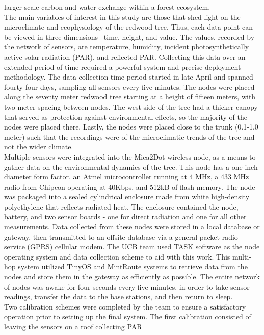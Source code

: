 \documentclass[]{article}
\begin{document}
larger scale carbon and water exchange within a forest ecosystem.\\
The main variables of interest in this study are those that shed light
on the microclimate and ecophysiology of the redwood tree. Thus, each
data point can be viewed in three dimensions-- time, height, and value.
The values, recorded by the network of sensors, are temperature,
humidity, incident photosynthetically active solar radiation (PAR), and
reflected PAR. Collecting this data over an extended period of time
required a powerful system and precise deployment methodology. The data
collection time period started in late April and spanned fourty-four
days, sampling all sensors every five minutes. The nodes were placed
along the seventy meter redwood tree starting at a height of fifteen
meters, with two-meter spacing between nodes. The west side of the tree
had a thicker canopy that served as protection against environmental
effects, so the majority of the nodes were placed there. Lastly, the
nodes were placed close to the trunk (0.1-1.0 meter) such that the
recordings were of the microclimatic trends of the tree and not the
wider climate.\\
Multiple sensors were integrated into the Mica2Dot wireless node, as a
means to gather data on the environmental dynamics of the tree. This
node has a one inch diameter form factor, an Atmel microcontroller
running at 4 MHz, a 433 MHz radio from Chipcon operating at 40Kbps, and
512kB of flash memory. The node was packaged into a sealed cylindrical
enclosure made from white high-density polyethylene that reflects
radiated heat. The enclosure contained the node, battery, and two sensor
boards - one for direct radiation and one for all other measurements.
Data collected from these nodes were stored in a local database or
gateway, then transmitted to an offsite database via a general packet
radio service (GPRS) cellular modem. The UCB team used TASK software as
the node operating system and data collection scheme to aid with this
work. This multi-hop system utilized TinyOS and MintRoute systems to
retrieve data from the nodes and store them in the gateway as
efficiently as possible. The entire network of nodes was awake for four
seconds every five minutes, in order to take sensor readings, transfer
the data to the base stations, and then return to sleep.\\
Two calibration schemes were completed by the team to ensure a
satisfactory operation prior to setting up the final system. The first
calibration consisted of leaving the sensors on a roof collecting PAR
\end{document}
